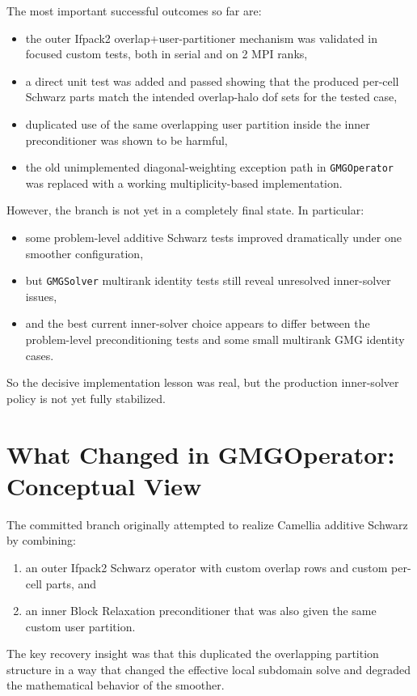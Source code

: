 \documentclass[11pt]{article}
\begin{document}
The most important successful outcomes so far are:
\begin{itemize}
  \item the outer Ifpack2 overlap+user-partitioner mechanism was validated in focused custom tests, both in serial and on 2 MPI ranks,
  \item a direct unit test was added and passed showing that the produced per-cell Schwarz parts match the intended overlap-halo dof sets for the tested case,
  \item duplicated use of the same overlapping user partition inside the inner preconditioner was shown to be harmful,
  \item the old unimplemented diagonal-weighting exception path in \texttt{GMGOperator} was replaced with a working multiplicity-based implementation.
\end{itemize}

However, the branch is not yet in a completely final state. In particular:
\begin{itemize}
  \item some problem-level additive Schwarz tests improved dramatically under one smoother configuration,
  \item but \texttt{GMGSolver} multirank identity tests still reveal unresolved inner-solver issues,
  \item and the best current inner-solver choice appears to differ between the problem-level preconditioning tests and some small multirank GMG identity cases.
\end{itemize}

So the decisive implementation lesson was real, but the production inner-solver policy is not yet fully stabilized.

\section{What Changed in GMGOperator: Conceptual View}
The committed branch originally attempted to realize Camellia additive Schwarz by combining:
\begin{enumerate}
  \item an outer Ifpack2 Schwarz operator with custom overlap rows and custom per-cell parts, and
  \item an inner Block Relaxation preconditioner that was also given the same custom user partition.
\end{enumerate}

The key recovery insight was that this duplicated the overlapping partition structure in a way that changed the effective local subdomain solve and degraded the mathematical behavior of the smoother.
\end{document}
